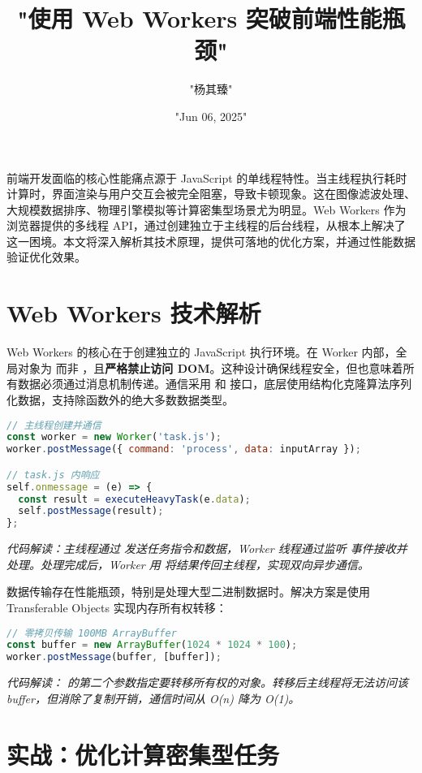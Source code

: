 \title{"使用 Web Workers 突破前端性能瓶颈"}
\author{"杨其臻"}
\date{"Jun 06, 2025"}
\maketitle
前端开发面临的核心性能痛点源于 JavaScript 的单线程特性。当主线程执行耗时计算时，界面渲染与用户交互会被完全阻塞，导致卡顿现象。这在图像滤波处理、大规模数据排序、物理引擎模拟等计算密集型场景尤为明显。Web Workers 作为浏览器提供的多线程 API，通过创建独立于主线程的后台线程，从根本上解决了这一困境。本文将深入解析其技术原理，提供可落地的优化方案，并通过性能数据验证优化效果。\par
\chapter{Web Workers 技术解析}
Web Workers 的核心在于创建独立的 JavaScript 执行环境。在 Worker 内部，全局对象为  而非 ，且\textbf{严格禁止访问 DOM}。这种设计确保线程安全，但也意味着所有数据必须通过消息机制传递。通信采用  和  接口，底层使用结构化克隆算法序列化数据，支持除函数外的绝大多数数据类型。\par
\begin{lstlisting}[language=javascript]
// 主线程创建并通信
const worker = new Worker('task.js');
worker.postMessage({ command: 'process', data: inputArray });

// task.js 内响应
self.onmessage = (e) => {
  const result = executeHeavyTask(e.data);
  self.postMessage(result);
};
\end{lstlisting}
\textit{代码解读：主线程通过  发送任务指令和数据，Worker 线程通过监听  事件接收并处理。处理完成后，Worker 用  将结果传回主线程，实现双向异步通信。}\par
数据传输存在性能瓶颈，特别是处理大型二进制数据时。解决方案是使用 Transferable Objects 实现内存所有权转移：\par
\begin{lstlisting}[language=javascript]
// 零拷贝传输 100MB ArrayBuffer
const buffer = new ArrayBuffer(1024 * 1024 * 100);
worker.postMessage(buffer, [buffer]); 
\end{lstlisting}
\textit{代码解读： 的第二个参数指定要转移所有权的对象。转移后主线程将无法访问该 buffer，但消除了复制开销，通信时间从 O(n) 降为 O(1)。}\par
\chapter{实战：优化计算密集型任务}
